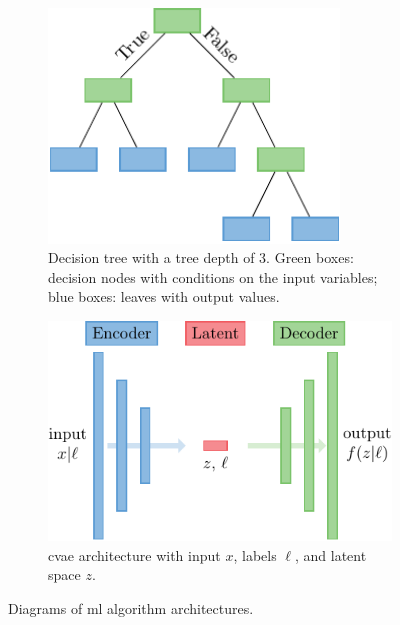 \documentclass[review]{elsarticle}
\begin{document}
\begin{figure}[!tbp]%
  \centering%
  \begin{subfigure}[t]{0.48\textwidth}%
    \centering
    \includegraphics[width=0.85\textwidth]{./figs/rf.pdf}%
    \caption{Decision tree with a tree depth of 3. Green boxes: decision nodes with conditions on the input variables; blue boxes: leaves with output values.}\label{fig:rf}%
  \end{subfigure}\hfill%
  \begin{subfigure}[t]{0.48\textwidth}%
    \centering
    \includegraphics[width=\textwidth]{./figs/cvae.pdf}%
    \caption{\Gls{cvae} architecture with input $x$, labels $\ell$, and latent space $z$.}\label{fig:cvae}%
  \end{subfigure}%
  \caption{Diagrams of \gls{ml} algorithm architectures.}
\end{figure}%
\end{document}
